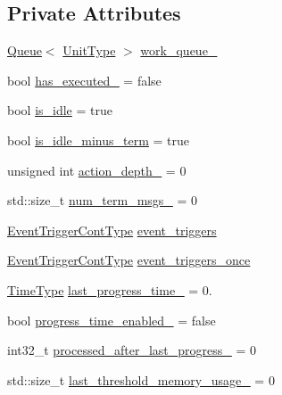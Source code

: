 \subsection*{Private Attributes}
\begin{DoxyCompactItemize}
\item 
\hyperlink{structvt_1_1sched_1_1_queue}{Queue}$<$ \hyperlink{structvt_1_1sched_1_1_scheduler_a398229f29b0940cea85aba4bae78b0be}{Unit\+Type} $>$ \hyperlink{structvt_1_1sched_1_1_scheduler_a8176bae441897c36b86e3fb917496a7a}{work\+\_\+queue\+\_\+}
\item 
bool \hyperlink{structvt_1_1sched_1_1_scheduler_ad67cd334d571ced5aa2ae2ffc6a8bec3}{has\+\_\+executed\+\_\+} = false
\item 
bool \hyperlink{structvt_1_1sched_1_1_scheduler_a99754f7b43db03bf0c67ae64d99c86ff}{is\+\_\+idle} = true
\item 
bool \hyperlink{structvt_1_1sched_1_1_scheduler_ad8e195a880684117d7cbb988488c36ef}{is\+\_\+idle\+\_\+minus\+\_\+term} = true
\item 
unsigned int \hyperlink{structvt_1_1sched_1_1_scheduler_a2cd57a3a421320e22d3ee8a6d47eb19e}{action\+\_\+depth\+\_\+} = 0
\item 
std\+::size\+\_\+t \hyperlink{structvt_1_1sched_1_1_scheduler_a4c70a87a9b15558a6ed628272a1db0fd}{num\+\_\+term\+\_\+msgs\+\_\+} = 0
\item 
\hyperlink{structvt_1_1sched_1_1_scheduler_a68203230dc48285d3d50bbb363ed267b}{Event\+Trigger\+Cont\+Type} \hyperlink{structvt_1_1sched_1_1_scheduler_a1f4ed72508099a9959a861f75e37f334}{event\+\_\+triggers}
\item 
\hyperlink{structvt_1_1sched_1_1_scheduler_a68203230dc48285d3d50bbb363ed267b}{Event\+Trigger\+Cont\+Type} \hyperlink{structvt_1_1sched_1_1_scheduler_a6bd19949bf8d905ea48f59ed544f6424}{event\+\_\+triggers\+\_\+once}
\item 
\hyperlink{namespacevt_a876a9d0cd5a952859c72de8a46881442}{Time\+Type} \hyperlink{structvt_1_1sched_1_1_scheduler_aba043e8bb57963e7a490376a06d0c96d}{last\+\_\+progress\+\_\+time\+\_\+} = 0.
\item 
bool \hyperlink{structvt_1_1sched_1_1_scheduler_a0eba67280dfcfb4d1e612e4cf15b8c4b}{progress\+\_\+time\+\_\+enabled\+\_\+} = false
\item 
int32\+\_\+t \hyperlink{structvt_1_1sched_1_1_scheduler_a826e82af9529a9f2dd087e4b8c14be9d}{processed\+\_\+after\+\_\+last\+\_\+progress\+\_\+} = 0
\item 
std\+::size\+\_\+t \hyperlink{structvt_1_1sched_1_1_scheduler_a49a7b0137e9096d9197d8a664eb28bf2}{last\+\_\+threshold\+\_\+memory\+\_\+usage\+\_\+} = 0

\end{DoxyCompactItemize}
